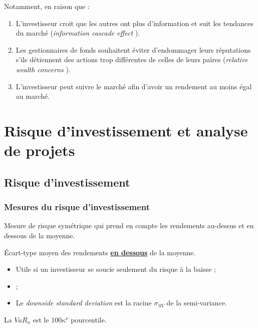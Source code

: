 \documentclass[10pt, french]{article}
\begin{document}
\begin{multicols*}{2}
\begin{definitionNOHFILLsub}
Notamment, en raison que :
\begin{enumerate}
	\item	L'investisseur croit que les autres ont plus d'information et suit les tendances du marché (\og \textit{information cascade effect} \fg{}).
	\item	Les gestionnaires de fonds souhaitent éviter d'endommager leurs réputations s'ils détiennent des actions trop différentes de celles de leurs paires (\og \textit{relative wealth concerns} \fg{}).
	\item	L'investisseur peut suivre le marché afin d'avoir un rendement au moins égal au marché.
\end{enumerate}
\end{definitionNOHFILLsub}


\pagebreak
\section{Risque d'investissement et analyse de projets}
\subsection{Risque d'investissement}
\subsubsection{Mesures du risque d'investissement}
\begin{definitionNOHFILL}[Variance]
Mesure de risque symétrique qui prend en compte les rendements au-dessus et en dessous de la moyenne.
\end{definitionNOHFILL}

\begin{definitionNOHFILL}
Écart-type moyen des rendements \underline{\textbf{en dessous}} de la moyenne.

\begin{itemize}
		\item	Utile si un investisseur se soucie seulement du risque à la baisse ;
		\item	{} ;
		\item	Le \og \textit{downside standard deviation} \fg{} est la racine $\sigma_{SV}$ de la semi-variance.
		\end{itemize}
\end{definitionNOHFILL}

\begin{definitionNOHFILL}
La $VaR_{\kappa}$ est le $100\kappa^{\text{e}}$ pourcentile.


\end{definitionNOHFILL}
\end{multicols*}
\end{document}

